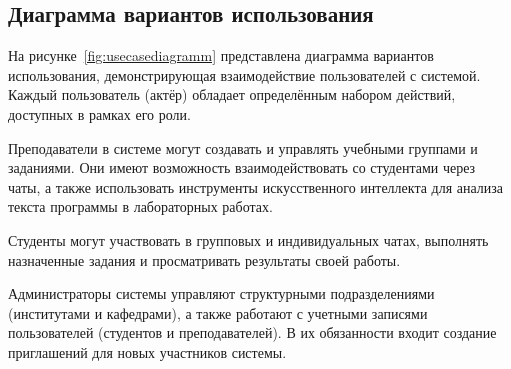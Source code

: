\subsection{Диаграмма вариантов использования}

На рисунке~\ref{fig:usecasediagramm} представлена диаграмма вариантов использования, демонстрирующая взаимодействие пользователей с системой. Каждый пользователь (актёр) обладает определённым набором действий, доступных в рамках его роли.

Преподаватели в системе могут создавать и управлять учебными группами и заданиями. Они имеют возможность взаимодействовать со студентами через чаты, а также использовать инструменты искусственного интеллекта для анализа текста программы в лабораторных работах.

Студенты могут участвовать в групповых и индивидуальных чатах, выполнять назначенные задания и просматривать результаты своей работы.

Администраторы системы управляют структурными подразделениями (институтами и кафедрами), а также работают с учетными записями пользователей (студентов и преподавателей). В их обязанности входит создание приглашений для новых участников системы.